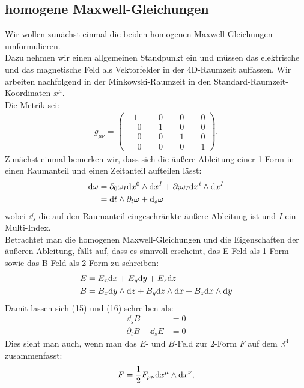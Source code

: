 \subsection{homogene Maxwell-Gleichungen}
Wir wollen zunächst einmal die beiden homogenen Maxwell-Gleichungen umformulieren. \\
Dazu nehmen wir einen allgemeinen Standpunkt ein und müssen das elektrische und das magnetische Feld als Vektorfelder in der 4D-Raumzeit auffassen. Wir arbeiten nachfolgend in der Minkowski-Raumzeit in den Standard-Raumzeit-Koordinaten $x^{\mu}$. \\
Die Metrik sei:
\begin{align}
g_{\mu \nu} =
\begin{pmatrix}
-1 & \phantom{-}0 & \phantom{-}0 & \phantom{-}0 \\
\phantom{-}0 & \phantom{-}1 & \phantom{-}0 & \phantom{-}0 \\
\phantom{-}0 & \phantom{-}0 & \phantom{-}1 & \phantom{-}0 \\
\phantom{-}0 & \phantom{-}0 & \phantom{-}0 & \phantom{-}1
\end{pmatrix}.
\end{align}
Zunächst einmal bemerken wir, dass sich die äußere Ableitung einer 1-Form in einen Raumanteil und einen Zeitanteil aufteilen lässt:
\begin{align}
\dd \omega &= \partial_0 \omega_I \dd x^0 \wedge \dd x^{I} + \partial_i \omega_I \dd x^i \wedge \dd x^{I} \notag\\
&= \dd t \wedge \partial_t \omega + \dd_s \omega 
\end{align}
wobei $\dd_s$ die auf den Raumanteil eingeschränkte äußere Ableitung ist und $I$ ein Multi-Index. \\
Betrachtet man die homogenen Maxwell-Gleichungen und die Eigenschaften der äußeren Ableitung, fällt auf, dass es sinnvoll erscheint, das E-Feld als 1-Form sowie das B-Feld als 2-Form zu schreiben:
\begin{align}
E &= E_x \dd x +E_y \dd y + E_z \dd z   \\
B &= B_x \dd y \wedge \dd z + B_y \dd z \wedge \dd x + B_z \dd x \wedge \dd y 
\end{align}
Damit lassen sich (15) und (16) schreiben als:
\begin{align}
\dd_s B &= 0 \\
\partial_t B + \dd_s E &=0
\end{align}
Dies sieht man auch, wenn man das $E$- und $B$-Feld zur 2-Form $F$ auf dem $\mathbb{R}^4$ zusammenfasst:
\begin{align}
F = \frac{1}{2} F_{\mu \nu} \dd x^{\mu} \wedge \dd x^{\nu},
\end{align}

